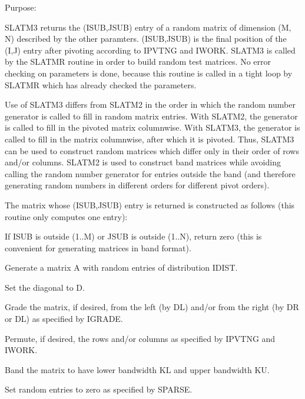 \begin{DoxyParagraph}{Purpose\+: }
\begin{DoxyVerb}    SLATM3 returns the (ISUB,JSUB) entry of a random matrix of
    dimension (M, N) described by the other paramters. (ISUB,JSUB)
    is the final position of the (I,J) entry after pivoting
    according to IPVTNG and IWORK. SLATM3 is called by the
    SLATMR routine in order to build random test matrices. No error
    checking on parameters is done, because this routine is called in
    a tight loop by SLATMR which has already checked the parameters.

    Use of SLATM3 differs from SLATM2 in the order in which the random
    number generator is called to fill in random matrix entries.
    With SLATM2, the generator is called to fill in the pivoted matrix
    columnwise. With SLATM3, the generator is called to fill in the
    matrix columnwise, after which it is pivoted. Thus, SLATM3 can
    be used to construct random matrices which differ only in their
    order of rows and/or columns. SLATM2 is used to construct band
    matrices while avoiding calling the random number generator for
    entries outside the band (and therefore generating random numbers
    in different orders for different pivot orders).

    The matrix whose (ISUB,JSUB) entry is returned is constructed as
    follows (this routine only computes one entry):

      If ISUB is outside (1..M) or JSUB is outside (1..N), return zero
         (this is convenient for generating matrices in band format).

      Generate a matrix A with random entries of distribution IDIST.

      Set the diagonal to D.

      Grade the matrix, if desired, from the left (by DL) and/or
         from the right (by DR or DL) as specified by IGRADE.

      Permute, if desired, the rows and/or columns as specified by
         IPVTNG and IWORK.

      Band the matrix to have lower bandwidth KL and upper
         bandwidth KU.

      Set random entries to zero as specified by SPARSE.\end{DoxyVerb}
 
\end{DoxyParagraph}

